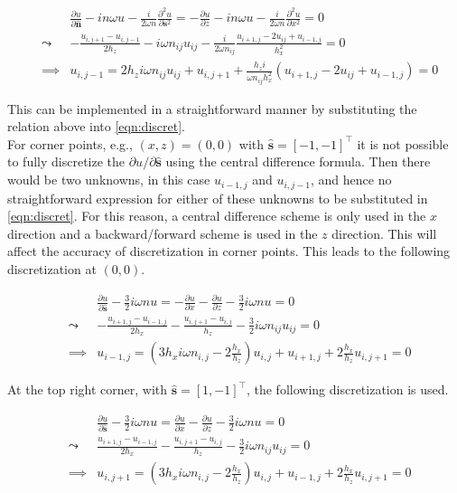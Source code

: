 \documentclass[10pt,a4paper]{article}
\newcommand{\n}{\mathbf{n}}
\newcommand{\s}{\mathbf{s}}
\begin{document}
\begin{eqnarray}
&&\frac{\partial u}{\partial \hat{\n}} - in\omega u - \frac{i}{2\omega n}\frac{\partial^2 u}{\partial \s^2}= -\frac{\partial u}{\partial z} - in\omega u - \frac{i}{2\omega n}\frac{\partial^2 u}{\partial x^2}=0\\
&\leadsto& -\frac{u_{i,j+1}-u_{i,j-1}}{2h_z} - i\omega n_{ij}u_{ij}-\frac{i}{2\omega n_{ij}}\frac{u_{i+1,j}-2u_{ij}+u_{i-1,j}}{h_x^2}=0\\
&\implies& u_{i,j-1} = 2h_z i\omega n_{ij}u_{ij}+u_{i,j+1}+\frac{h_z i}{\omega n_{ij}h_x^2}(u_{i+1,j}-2u_{ij}+u_{i-1,j})=0
\end{eqnarray}

This can be implemented in a straightforward manner by substituting the relation above into \cref{eqn:discret}.\\

For corner points, e.g., $(x,z)=(0,0)$ with $\hat{\s}=[-1,-1]^\top$ it is not possible to fully discretize the $\partial u/\partial\hat{\s}$ using the central difference formula. Then there would be two unknowns, in this case $u_{i-1,j}$ and $u_{i,j-1}$, and hence no straightforward expression for either of these unknowns to be substituted in \cref{eqn:discret}. For this reason, a central difference scheme is only used in the $x$ direction and a backward/forward scheme is used in the $z$ direction. This will affect the accuracy of discretization in corner points. This leads to the following discretization at $(0,0)$.

\begin{eqnarray}
&& \frac{\partial u}{\partial \hat{\s}}-\frac{3}{2}i\omega nu= -\frac{\partial u}{\partial x}-\frac{\partial u}{\partial z}-\frac{3}{2}i\omega nu=0\\
&\leadsto& -\frac{u_{i+1,j}-u_{i-1,j}}{2h_x}-\frac{u_{i,j+1}-u_{i,j}}{h_z}-\frac{3}{2}i\omega n_{ij}u_{ij}=0\\
&\implies& u_{i-1,j} = (3h_xi\omega n_{i,j}-2\frac{h_x}{h_z})u_{i,j}+u_{i+1,j}+2\frac{h_x}{h_z}u_{i,j+1}=0
\end{eqnarray}

At the top right corner, with $\hat{\s}=[1,-1]^\top$, the following discretization is used.

\begin{eqnarray}
&& \frac{\partial u}{\partial \hat{\s}}-\frac{3}{2}i\omega nu= \frac{\partial u}{\partial x}-\frac{\partial u}{\partial z}-\frac{3}{2}i\omega nu=0\\
&\leadsto& \frac{u_{i+1,j}-u_{i-1,j}}{2h_x}-\frac{u_{i,j+1}-u_{i,j}}{h_z}-\frac{3}{2}i\omega n_{ij}u_{ij}=0\\
&\implies& u_{i,j+1} = (3h_xi\omega n_{i,j}-2\frac{h_x}{h_z})u_{i,j}+u_{i-1,j}+2\frac{h_x}{h_z}u_{i,j+1}=0
\end{eqnarray}
\end{document}
